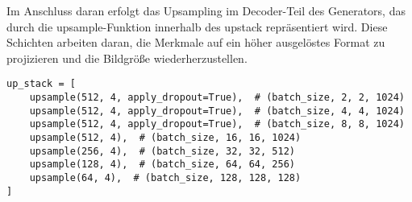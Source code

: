 Im Anschluss daran erfolgt das Upsampling im Decoder-Teil des Generators, das durch die upsample-Funktion innerhalb des upstack repräsentiert wird. Diese Schichten arbeiten daran, die Merkmale auf ein höher ausgelöstes Format zu projizieren und die Bildgröße wiederherzustellen.

\begin{lstlisting}[language=pyhaff, caption={Upsampling-Schritt in Pix2Pix}, label={cod:Pix2PixGAN Generator}]
up_stack = [
	upsample(512, 4, apply_dropout=True),  # (batch_size, 2, 2, 1024)
	upsample(512, 4, apply_dropout=True),  # (batch_size, 4, 4, 1024)
	upsample(512, 4, apply_dropout=True),  # (batch_size, 8, 8, 1024)
	upsample(512, 4),  # (batch_size, 16, 16, 1024)
	upsample(256, 4),  # (batch_size, 32, 32, 512)
	upsample(128, 4),  # (batch_size, 64, 64, 256)
	upsample(64, 4),  # (batch_size, 128, 128, 128)
]
\end{lstlisting}

